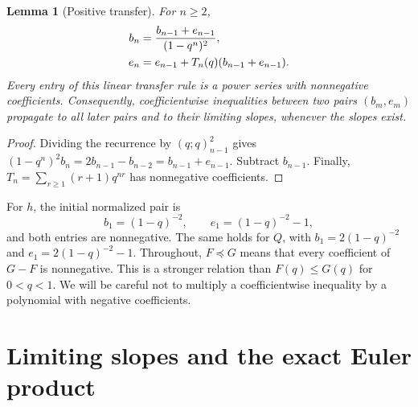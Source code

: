 \documentclass[11pt]{article}
\numberwithin{equation}{section}
\newtheorem{lemma}[theorem]{Lemma}
\theoremstyle{definition}\newtheorem{definition}[theorem]{Definition}
\theoremstyle{remark}\newtheorem{remark}[theorem]{Remark}
\newcommand{\pp}[1]{(q;q)_{#1}}
\newcommand{\pre}{\preccurlyeq}
\begin{document}
\begin{lemma}[Positive transfer]\label{lcp:lem:positive}
For $n\ge2$,
\begin{align}\label{lcp:eq:positive}
 b_n&=\frac{b_{n-1}+e_{n-1}}{(1-q^n)^2},\\
 e_n&=e_{n-1}+T_n(q)(b_{n-1}+e_{n-1}).\notag
\end{align}
Every entry of this linear transfer rule is a power series with nonnegative
coefficients. Consequently, coefficientwise inequalities between two
pairs $(b_m,e_m)$ propagate to all later pairs and to their limiting slopes,
whenever the slopes exist.
\end{lemma}
\begin{proof}
Dividing the recurrence by $\pp{n-1}^2$ gives
$(1-q^n)^2b_n=2b_{n-1}-b_{n-2}=b_{n-1}+e_{n-1}$.
Subtract $b_{n-1}$. Finally,
$T_n=\sum_{r\ge1}(r+1)q^{nr}$ has nonnegative coefficients.
\end{proof}

For $h$, the initial normalized pair is
\[
 b_1=(1-q)^{-2},\qquad e_1=(1-q)^{-2}-1,
\]
and both entries are nonnegative. The same holds for $Q$, with
$b_1=2(1-q)^{-2}$ and $e_1=2(1-q)^{-2}-1$.
Throughout, $F\pre G$ means that every coefficient of $G-F$ is
nonnegative. This is a stronger relation than $F(q)\le G(q)$ for
$0<q<1$. We will be careful not to multiply a coefficientwise inequality
by a polynomial with negative coefficients.

\section{Limiting slopes and the exact Euler product}
\end{document}
